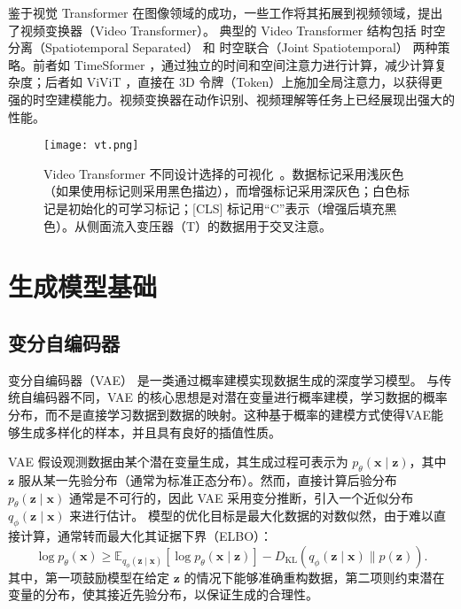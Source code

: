 鉴于视觉 Transformer 在图像领域的成功，一些工作将其拓展到视频领域，提出了视频变换器（Video Transformer）。
典型的 Video Transformer 结构包括 时空分离（Spatiotemporal Separated） 和 时空联合（Joint Spatiotemporal） 两种策略。前者如 TimeSformer \cite{bertasius2021space}，通过独立的时间和空间注意力进行计算，减少计算复杂度；后者如 ViViT \cite{arnab2021vivit}，直接在 3D 令牌（Token）上施加全局注意力，以获得更强的时空建模能力。视频变换器在动作识别、视频理解等任务上已经展现出强大的性能。

\begin{figure}[htbp]
    \centering
    \texttt{[image: vt.png]}
    \caption{Video Transformer 不同设计选择的可视化~\cite{selva2023video}。数据标记采用浅灰色（如果使用标记则采用黑色描边），而增强标记采用深灰色；白色标记是初始化的可学习标记；[CLS] 标记用“C”表示（增强后填充黑色）。从侧面流入变压器（T）的数据用于交叉注意。}
    \label{fig:vt}
\end{figure}

\section{生成模型基础}

\subsection{变分自编码器}

变分自编码器（VAE）\cite{kingma2013vae} 是一类通过概率建模实现数据生成的深度学习模型。
与传统自编码器不同，VAE 的核心思想是对潜在变量进行概率建模，学习数据的概率分布，而不是直接学习数据到数据的映射。这种基于概率的建模方式使得VAE能够生成多样化的样本，并且具有良好的插值性质。

VAE 假设观测数据由某个潜在变量生成，其生成过程可表示为 $p_{\theta}(\mathbf{x} \mid \mathbf{z})$，其中 $\mathbf{z}$ 服从某一先验分布（通常为标准正态分布）。然而，直接计算后验分布 $p_{\theta}(\mathbf{z} \mid \mathbf{x})$ 通常是不可行的，因此 VAE 采用变分推断，引入一个近似分布 $q_{\phi}(\mathbf{z} \mid \mathbf{x})$ 来进行估计。
模型的优化目标是最大化数据的对数似然，由于难以直接计算，通常转而最大化其证据下界（ELBO）：
\begin{equation}
    \log p_{\theta}(\mathbf{x}) \geq \mathbb{E}_{q_{\phi}(\mathbf{z} \mid \mathbf{x})} \left[ \log p_{\theta}(\mathbf{x} \mid \mathbf{z}) \right] - D_{\mathrm{KL}} \left( q_{\phi}(\mathbf{z} \mid \mathbf{x}) \parallel p(\mathbf{z}) \right).
\end{equation}
其中，第一项鼓励模型在给定 $\mathbf{z}$ 的情况下能够准确重构数据，第二项则约束潜在变量的分布，使其接近先验分布，以保证生成的合理性。

